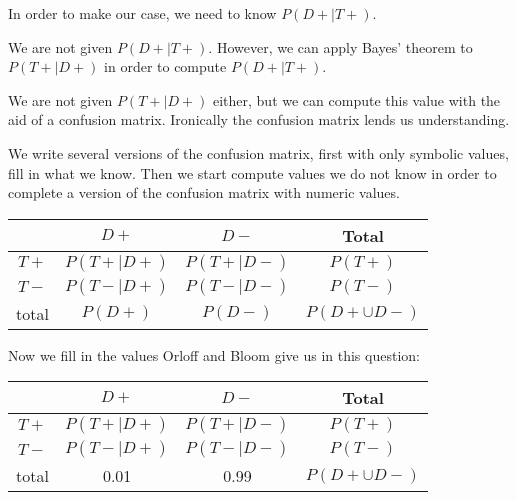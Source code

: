 \documentclass[a4paper,11pt]{article}
\begin{document}
In order to make our case, we need to know $P \left( D+ \mid T+ \right)$.

We are not given $P \left( D+ \mid T+ \right)$.  However, we can apply
Bayes' theorem to $P \left(T+ \mid D+ \right)$ in order to compute
$P \left( D+ \mid T+ \right)$.

We are not given $P \left(T+ \mid D+ \right)$ either, but we can
compute this value with the aid of a confusion matrix. Ironically the
confusion matrix lends us understanding.

We write several versions of the confusion matrix, first with only
symbolic values, fill in what we know. Then we start compute values
we do not know in order to complete a version of the confusion matrix
with numeric values.

\begin{center}
  \begin{tabular}{ | c | c | c | c | }
    \hline
         & $D+$ & $D-$ & Total   \\ \hline
    $T+$ & $P \left(T+ \mid D+ \right)$ & $P \left( T+ \mid D- \right) $ & $P \left( T+ \right)$ \\ \hline
    $T-$ & $P \left(T- \mid D+ \right)$ & $P \left( T- \mid D- \right) $ & $P \left( T- \right)$ \\ \hline
    total & $P \left( D+ \right)$ & $P \left( D- \right)$ & $P\left( D+ \cup D- \right)$ \\ \hline
  \end{tabular}
\end{center}

Now we fill in the values Orloff and Bloom give us in this question:

\begin{center}
  \begin{tabular}{ | c | c | c | c | }
    \hline
         & $D+$ & $D-$ & Total   \\ \hline
    $T+$ & $P \left(T+ \mid D+ \right)$ & $P \left( T+ \mid D- \right) $ & $P \left( T+ \right)$ \\ \hline
    $T-$ & $P \left(T- \mid D+ \right)$ & $P \left( T- \mid D- \right) $ & $P \left( T- \right)$ \\ \hline
    total & 0.01 & 0.99 & $P\left( D+ \cup D- \right)$ \\ \hline
  \end{tabular}
\end{center}
\printbibliography{}
\end{document}
